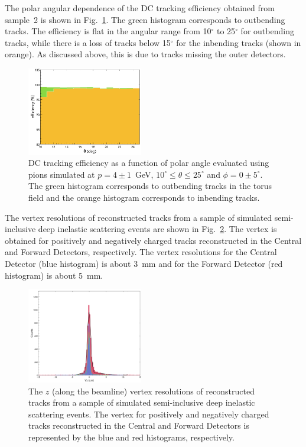 The polar angular dependence of the DC tracking efficiency obtained from sample~2 is shown in
Fig.~\ref{fig:trkeffinoutb}. The green histogram corresponds to outbending tracks. The efficiency is flat
in the angular range from 10$^\circ$ to 25$^\circ$ for outbending tracks, while there is a loss of tracks below
15$^\circ$ for the inbending tracks (shown in orange). As discussed above, this is due to tracks missing the outer
detectors.
\begin{figure}[t]
\includegraphics[width=0.45\textwidth]{pics/DCTrkEffvsThetaInandOutbenders.png}
\caption{DC tracking efficiency as a function of polar angle evaluated using pions simulated at $p=4\pm 1$~GeV,
  $10^\circ \leq \theta \leq 25^\circ$ and $\phi = 0 \pm 5^\circ$. The green histogram corresponds to outbending
  tracks in the torus field and the orange histogram corresponds to inbending tracks.}
\label{fig:trkeffinoutb}
\end{figure}

The vertex resolutions of reconstructed tracks from a sample of simulated semi-inclusive deep inelastic scattering
events are shown in Fig.~\ref{fig:vtxres}. The vertex is obtained for positively and negatively charged tracks
reconstructed in the Central and Forward Detectors, respectively. The vertex resolutions for the Central Detector
(blue histogram) is about 3~mm and for the Forward Detector (red histogram) is about 5~mm. 

\begin{figure}[ht]
\includegraphics[width=0.45\textwidth]{pics/VertexResolution.png}
\caption{The $z$ (along the beamline) vertex resolutions of reconstructed tracks from a sample of simulated
  semi-inclusive deep inelastic scattering events. The vertex for positively and negatively charged tracks reconstructed
  in the Central and Forward Detectors is represented by the blue and red histograms, respectively.}
\label{fig:vtxres}
\end{figure}

